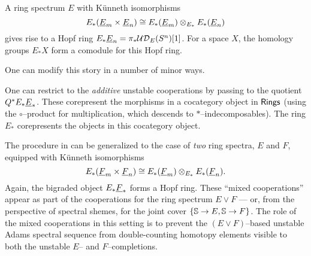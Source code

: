 \begin{remark}\label{HopfRingFromOneRingSpectrum}
A ring spectrum $E$ with K\"unneth isomorphisms \[E_*(\OS{E}{m} \times \OS{E}{n}) \cong E_*(\OS{E}{m}) \otimes_{E_*} E_*(\OS{E}{n})\] gives rise to a Hopf ring $E_* \OS{E}{n} = \pi_* \sheaf{UD}_E(S^n)[1]$.  For a space $X$, the homology groups $E_* X$ form a comodule for this Hopf ring.
\end{remark}

One can modify this story in a number of minor ways.

\begin{remark}
One can restrict to the \emph{additive} unstable cooperations by passing to the quotient $Q^\ast E_* \OS{E}{*}$.  These corepresent the morphisms in a cocategory object in $\CatOf{Rings}$ (using the $\circ$--product for multiplication, which descends to $\ast$--indecomposables).  The ring $E_*$ corepresents the objects in this cocategory object.
\end{remark}

\begin{remark}
The procedure in  can be generalized to the case of \emph{two} ring spectra, $E$ and $F$, equipped with K\"unneth isomorphisms \[E_*(\OS{F}{m} \times \OS{F}{n}) \cong E_*(\OS{F}{m}) \otimes_{E_*} E_*(\OS{F}{n}).\]  Again, the bigraded object $E_* \OS{F}{*}$ forms a Hopf ring.  These ``mixed cooperations'' appear as part of the cooperations for the ring spectrum $E \vee F$ --- or, from the perspective of spectral shemes, for the joint cover $\{\S \to E, \S \to F\}$.  The role of the mixed cooperations in this setting is to prevent the $(E \vee F)$--based unstable Adams spectral sequence from double-counting homotopy elements visible to both the unstable $E$-- and $F$--completions.
\end{remark}

